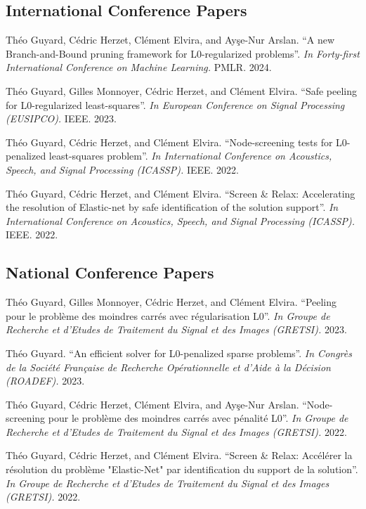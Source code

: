 \subsection*{International Conference Papers}
\label{publications:international-conference-papers}

\begin{etaremune}
    \item Théo Guyard, Cédric Herzet, Clément Elvira, and Ay\c{s}e-Nur Arslan. ``A new Branch-and-Bound pruning framework for L0-regularized problems''. \textit{In Forty-first International Conference on Machine Learning.} PMLR. 2024.
    \item Théo Guyard, Gilles Monnoyer, Cédric Herzet,  and Clément Elvira. ``Safe peeling for L0-regularized least-squares''. \textit{In European Conference on Signal Processing (EUSIPCO).} IEEE. 2023.
    \item Théo Guyard, Cédric Herzet, and Clément Elvira. ``Node-screening tests for L0-penalized least-squares problem''. \textit{In International Conference on Acoustics, Speech, and Signal Processing (ICASSP).} IEEE. 2022.
    \item Théo Guyard, Cédric Herzet, and Clément Elvira. ``Screen \& Relax: Accelerating the resolution of Elastic-net by safe identification of the solution support''. \textit{In International Conference on Acoustics, Speech, and Signal Processing (ICASSP).} IEEE. 2022.
\end{etaremune}

\subsection*{National Conference Papers}
\label{publications:national-conference-papers}

\begin{etaremune}
    \item Théo Guyard, Gilles Monnoyer, Cédric Herzet,  and Clément Elvira. ``Peeling pour le problème des moindres carrés avec régularisation L0''. \textit{In Groupe de Recherche et d'Etudes de Traitement du Signal et des Images (GRETSI).} 2023.
    \item Théo Guyard. ``An efficient solver for L0-penalized sparse problems''. \textit{In Congrès de la Société Française de Recherche Opérationnelle et d'Aide à la Décision (ROADEF).} 2023.
    \item Théo Guyard, Cédric Herzet, Clément Elvira, and Ay\c{s}e-Nur Arslan. ``Node-screening pour le problème des moindres carrés avec pénalité L0''. \textit{In Groupe de Recherche et d'Etudes de Traitement du Signal et des Images (GRETSI).} 2022.
    \item Théo Guyard, Cédric Herzet, and Clément Elvira. ``Screen \& Relax: Accélérer la résolution du problème "Elastic-Net" par identification du support de la solution''. \textit{In Groupe de Recherche et d'Etudes de Traitement du Signal et des Images (GRETSI).} 2022.
\end{etaremune}


